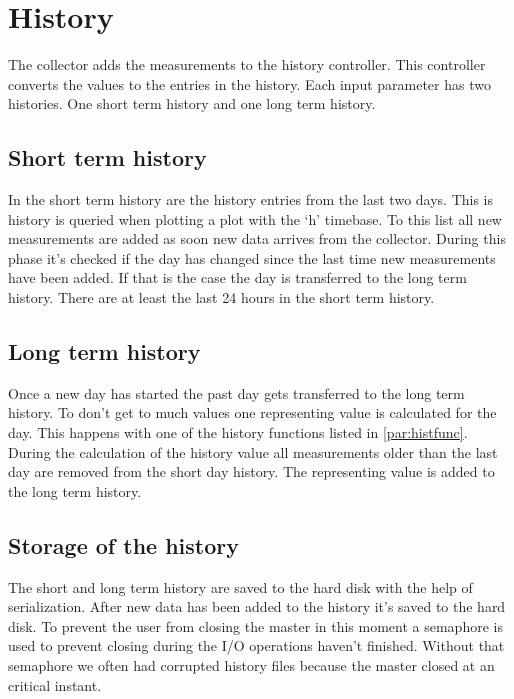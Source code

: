 {\C  }


\section{History} %
\label{sec:history}
The collector adds the measurements to the history controller. This controller converts the values to the entries in the history. Each input parameter has two histories. One short term history and one long term history. 
\subsection{Short term history} %
\label{sub:short_term_history}
In the short term history are the history entries from the last two days. This is history is queried when plotting a plot with the `h' timebase. To this list all new measurements are added as soon new data arrives from the collector. During this phase it's checked if the day has changed since the last time new measurements have been added. If that is the case the day is transferred to the long term history. There are at least the last 24 hours in the short term history.

\subsection{Long term history} %
\label{ssub:long_term_history}
Once a new day has started the past day gets transferred to the long term history. To don't get to much values one representing value is calculated for the day. This happens with one of the history functions listed in \ref{par:histfunc}. During the calculation of the history value all measurements older than the last day are removed from the short day history. The representing value is added to the long term history.

\subsection{Storage of the history} %
\label{sub:storage_of_the_history}
The short and long term history are saved to the hard disk with the help of serialization. After new data has been added to the history it's saved to the hard disk. To prevent the user from closing the master in this moment a semaphore is used to prevent closing during the I/O operations haven't finished. Without that semaphore we often had corrupted history files because the master closed at an critical instant. 

